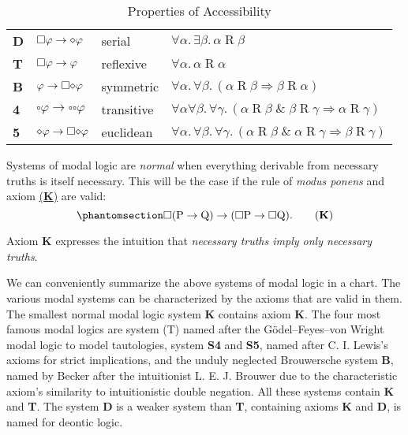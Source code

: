 \documentclass[
  12pt,
  letterpaper,
  DIV=11,
  numbers=noendperiod,
  twoside]{scrreprt}
\theoremstyle{remark}
\begin{document}
\begin{longtable}[]{@{}
  >{\centering\arraybackslash}p{}
  >{\raggedright\arraybackslash}p{}
  >{\raggedright\arraybackslash}p{}
  >{\raggedright\arraybackslash}p{}@{}}
\caption{Properties of
Accessibility}\label{tbl-properties-of-accessibility}\tabularnewline
\toprule\noalign{}
\endfirsthead
\endhead
\bottomrule\noalign{}
\endlastfoot
\textbf{D} &
\({\small\square} \varphi \rightarrow {\Large\diamond} \varphi\) &
serial &
\(\forall \alpha.\,\exists \beta.\, \alpha \mathbin{R} \beta\) \\
\textbf{T} & \({\small\square} \varphi \rightarrow \varphi\) & reflexive
& \(\forall \alpha.\,\alpha \mathbin{R} \alpha\) \\
\textbf{B} & \(\varphi \rightarrow \square {\Large\diamond} \varphi\) &
symmetric &
\(\forall \alpha.\, \forall \beta.\, (\alpha \mathbin{R} \beta \Rightarrow \beta \mathbin{R} \alpha)\) \\
\textbf{4} & \(\square \varphi \rightarrow \square \square \varphi\) &
transitive &
\(\forall \alpha \forall \beta .\, \forall \gamma.\, (\alpha \mathbin{R} \beta \;\&\; \beta \mathbin{R} \gamma \Rightarrow \alpha \mathbin{R} \gamma)\) \\
\textbf{5} &
\({\Large\diamond} \varphi \rightarrow \square {\Large\diamond} \varphi\)
& euclidean &
\(\forall \alpha.\, \forall \beta.\, \forall \gamma.\, (\alpha \mathbin{R} \beta \;\&\; \alpha \mathbin{R} \gamma \Rightarrow \beta \mathbin{R} \gamma)\) \\
\end{longtable}

Systems of modal logic are \emph{normal} when everything derivable from
necessary truths is itself necessary. This will be the case if the rule
of \emph{modus ponens} and axiom
\hyperref[eq-modal-axiom-K-2]{(\textbf{K})} are valid:
\begin{equation}\phantomsection\label{eq-modal-axiom-K-2}{
\Box(\mathrm{P}\to \mathrm{Q})\to(\Box \mathrm{P}\to\Box \mathrm{Q}).\tag*{(\textbf{K})}
}\end{equation}

Axiom \textbf{K} expresses the intuition that \emph{necessary truths
imply only necessary truths}.

We can conveniently summarize the above systems of modal logic in a
chart. The various modal systems can be characterized by the axioms that
are valid in them. The smallest normal modal logic system \textbf{K}
contains axiom \textbf{K}. The four most famous modal logics are system
(T) named after the Gödel--Feyes--von Wright modal logic to model
tautologies, system \textbf{S4} and \textbf{S5}, named after C. I.
Lewis's axioms for strict implications, and the unduly neglected
Brouwersche system \textbf{B}, named by Becker after the intuitionist L.
E. J. Brouwer due to the characteristic axiom's similarity to
intuitionistic double negation. All these systems contain \textbf{K} and
\textbf{T}. The system \textbf{D} is a weaker system than \textbf{T},
containing axioms \textbf{K} and \textbf{D}, is named for deontic logic.
\end{document}
